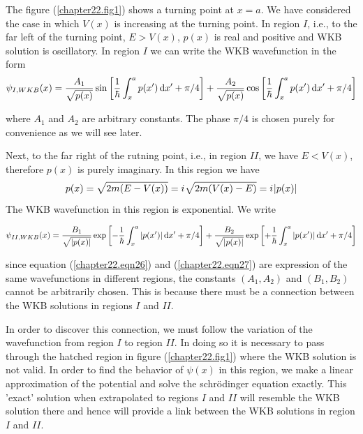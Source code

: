 The figure (\ref{chapter22.fig1}) shows a turning point at $x=a$. We have considered the case in which $V(x)$ is increasing at the turning point. In region $I$, i.e., to the far left of the turning point, $E > V(x)$, $p(x)$ is real and positive and WKB solution is oscillatory. In region $I$ we can write the WKB wavefunction in the form
\begin{equation}
	\label{chapter22.eqn26}
	\psi_{I,WKB}(x) = \frac{A_1}{\sqrt{p(x)}} \sin \qty[\frac{1}{\hbar} \int_{x}^{a} p(x^\prime) \dd{x^\prime} + \pi/4]  +  \frac{A_2}{\sqrt{p(x)}} \cos \qty[\frac{1}{\hbar} \int_{x}^{a} p(x^\prime) \dd{x^\prime} + \pi/4]
\end{equation}

where $A_1$ and $A_2$ are arbitrary constants. The phase $\pi/4$ is chosen purely for convenience as we will see later.

Next, to the far right of the rutning point, i.e., in region $II$, we have $E<V(x)$, therefore $p(x)$ is purely imaginary. In this region we have
\begin{equation}
p(x) = \sqrt{2 m \qty(E - V(x))} = {i\mkern1mu} \sqrt{2 m \qty(V(x) - E)} = {i\mkern1mu} \abs{p(x)}
\end{equation}
The WKB wavefunction in this region is exponential. We write

\begin{equation}
\label{chapter22.eqn27}
\psi_{II,WKB}(x) = \frac{B_1}{\sqrt{\abs{p(x)}}} \exp \qty[-\frac{1}{\hbar} \int_{x}^{a} \abs{p(x^\prime)} \dd{x^\prime} + \pi/4]  +  \frac{B_2}{\sqrt{\abs{p(x)}}} \exp \qty[+\frac{1}{\hbar} \int_{x}^{a} \abs{p(x^\prime)} \dd{x^\prime} + \pi/4]
\end{equation}

since equation (\ref{chapter22.eqn26}) and (\ref{chapter22.eqn27}) are expression of the same wavefunctions in different regions, the constants $(A_1, A_2)$ and $(B_1,B_2)$ cannot be arbitrarily chosen. This is because there must be a connection between the WKB solutions in regions $I$ and $II$.

In order to discover this connection, we must follow the variation of the wavefunction from region $I$ to region $II$. In doing so it is necessary to pass through the hatched region in figure (\ref{chapter22.fig1}) where the WKB solution is not valid. In order to find the behavior of $\psi(x)$ in this region, we make a linear approximation of the potential and solve the schr\"{o}dinger equation exactly. This 'exact' solution when extrapolated to regions $I$ and $II$ will resemble the WKB solution there and hence will provide a link between the WKB solutions in region $I$ and $II$.\\

